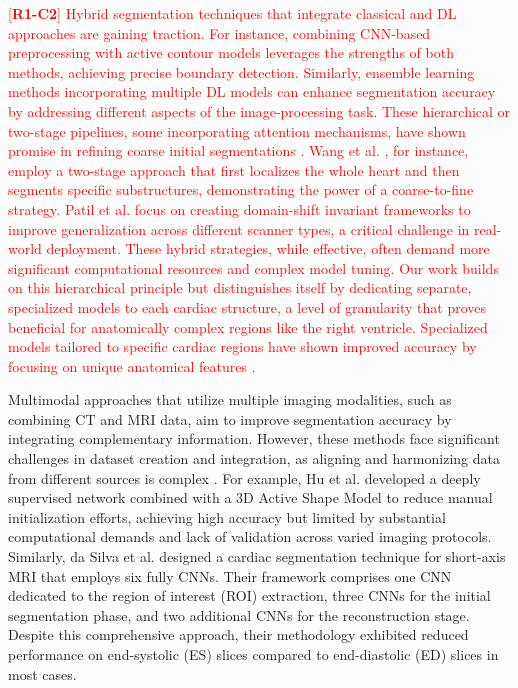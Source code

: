 \documentclass[fleqn,10pt]{wlscirep}
\newcommand{\revtag}[2]{[\textbf{R#1-C#2}]}
\newcommand{\Rone}[1]{\textcolor{red}{#1}}
\begin{document}
\Rone{\revtag{1}{2} Hybrid segmentation techniques that integrate classical and DL approaches are gaining traction. For instance, combining CNN-based preprocessing with active contour models leverages the strengths of both methods, achieving precise boundary detection. Similarly, ensemble learning methods incorporating multiple DL models can enhance segmentation accuracy by addressing different aspects of the image-processing task. These hierarchical or two-stage pipelines, some incorporating attention mechanisms, have shown promise in refining coarse initial segmentations \cite{Wang:2023b,Patil:2023}. Wang et al. \cite{Wang:2023b}, for instance, employ a two-stage approach that first localizes the whole heart and then segments specific substructures, demonstrating the power of a coarse-to-fine strategy. Patil et al. \cite{Patil:2023} focus on creating domain-shift invariant frameworks to improve generalization across different scanner types, a critical challenge in real-world deployment. These hybrid strategies, while effective, often demand more significant computational resources and complex model tuning. Our work builds on this hierarchical principle but distinguishes itself by dedicating separate, specialized models to each cardiac structure, a level of granularity that proves beneficial for anatomically complex regions like the right ventricle. Specialized models tailored to specific cardiac regions have shown improved accuracy by focusing on unique anatomical features \cite{Wehbe:2023}.}

Multimodal approaches that utilize multiple imaging modalities, such as combining CT and MRI data, aim to improve segmentation accuracy by integrating complementary information. However, these methods face significant challenges in dataset creation and integration, as aligning and harmonizing data from different sources is complex \cite{Pandey:2023,Azam:2022}. For example, Hu et al. \cite{Hu:2023} developed a deeply supervised network combined with a 3D Active Shape Model to reduce manual initialization efforts, achieving high accuracy but limited by substantial computational demands and lack of validation across varied imaging protocols. Similarly, da Silva et al. \cite{daSilva:2024} designed a cardiac segmentation technique for short-axis MRI that employs six fully CNNs. Their framework comprises one CNN dedicated to the region of interest (ROI) extraction, three CNNs for the initial segmentation phase, and two additional CNNs for the reconstruction stage. Despite this comprehensive approach, their methodology exhibited reduced performance on end-systolic (ES) slices compared to end-diastolic (ED) slices in most cases.
\end{document}
